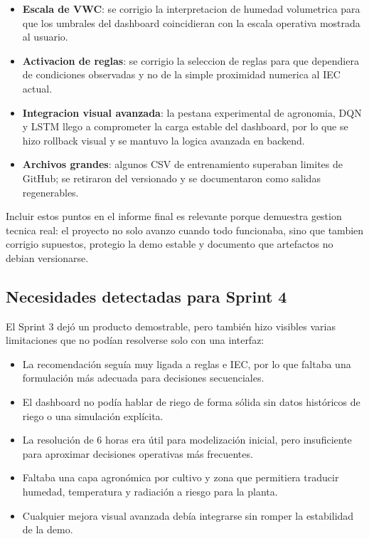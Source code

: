 ﻿\documentclass[11pt,a4paper]{article}
\begin{document}
\begin{itemize}
    \item \textbf{Escala de VWC}: se corrigio la interpretacion de humedad volumetrica para que los umbrales del dashboard coincidieran con la escala operativa mostrada al usuario.
    \item \textbf{Activacion de reglas}: se corrigio la seleccion de reglas para que dependiera de condiciones observadas y no de la simple proximidad numerica al IEC actual.
    \item \textbf{Integracion visual avanzada}: la pestana experimental de agronomia, DQN y LSTM llego a comprometer la carga estable del dashboard, por lo que se hizo rollback visual y se mantuvo la logica avanzada en backend.
    \item \textbf{Archivos grandes}: algunos CSV de entrenamiento superaban limites de GitHub; se retiraron del versionado y se documentaron como salidas regenerables.
\end{itemize}

Incluir estos puntos en el informe final es relevante porque demuestra gestion tecnica real: el proyecto no solo avanzo cuando todo funcionaba, sino que tambien corrigio supuestos, protegio la demo estable y documento que artefactos no debian versionarse.

\subsection{Necesidades detectadas para Sprint 4}

El Sprint 3 dejó un producto demostrable, pero también hizo visibles varias limitaciones que no podían resolverse solo con una interfaz:

\begin{itemize}
    \item La recomendación seguía muy ligada a reglas e IEC, por lo que faltaba una formulación más adecuada para decisiones secuenciales.
    \item El dashboard no podía hablar de riego de forma sólida sin datos históricos de riego o una simulación explícita.
    \item La resolución de 6 horas era útil para modelización inicial, pero insuficiente para aproximar decisiones operativas más frecuentes.
    \item Faltaba una capa agronómica por cultivo y zona que permitiera traducir humedad, temperatura y radiación a riesgo para la planta.
    \item Cualquier mejora visual avanzada debía integrarse sin romper la estabilidad de la demo.
\end{itemize}
\end{document}
